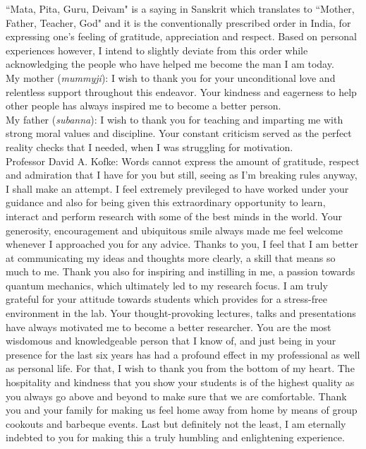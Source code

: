 ``Mata, Pita, Guru, Deivam" is a saying in Sanskrit which translates to ``Mother, Father, Teacher, God" and it is the conventionally prescribed order in India, for expressing one's feeling of gratitude, appreciation and respect. Based on personal experiences however, I intend to slightly deviate from this order while acknowledging the people who have helped me become the man I am today.\\

\noindent My mother (\emph{mummyji}): I wish to thank you for your unconditional love and relentless support throughout this endeavor. Your kindness and eagerness to help other people has always inspired me to become a better person.\\

\noindent My father (\emph{subanna}): I wish to thank you for teaching and imparting me with strong moral values and discipline. Your constant criticism served as the perfect reality checks that I needed, when I was struggling for motivation.\\

\noindent Professor David A. Kofke: Words cannot express the amount of gratitude, respect and admiration that I have for you but still, seeing as I'm breaking rules anyway, I shall make an attempt. I feel extremely previleged to have worked under your guidance and also for being given this extraordinary opportunity to learn, interact and perform research with some of the best minds in the world. Your generosity, encouragement and ubiquitous smile always made me feel welcome whenever I approached you for any advice. Thanks to you, I feel that I am better at communicating my ideas and thoughts more clearly, a skill that means so much to me. Thank you also for inspiring and instilling in me, a passion towards quantum mechanics, which ultimately led to my research focus. I am truly grateful for your attitude towards students which provides for a stress-free environment in the lab. Your thought-provoking lectures, talks and presentations have always motivated me to become a better researcher. You are the most wisdomous and knowledgeable person that I know of, and just being in your presence for the last six years has had a profound effect in my professional as well as personal life. For that, I wish to thank you from the bottom of my heart. The hospitality and kindness that you show your students is of the highest quality as you always go above and beyond to make sure that we are comfortable. Thank you and your family for making us feel home away from home by means of group cookouts and barbeque events. Last but definitely not the least, I am eternally indebted to you for making this a truly humbling and enlightening experience.\\

